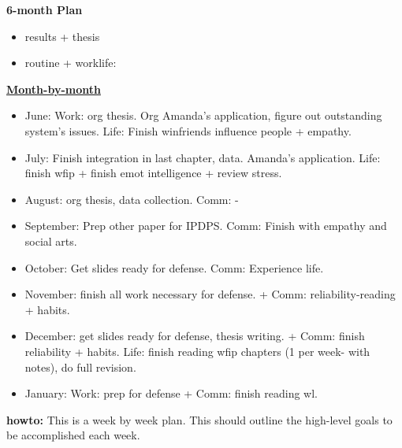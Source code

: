 \documentclass[11pt]{article}
\begin{document}
\textbf{6-month Plan} 
\begin{itemize} 
  \tiny \item \tiny results + thesis
\item \tiny routine + worklife:
\end{itemize}

\newpage
    {\small \underline{\textbf{Month-by-month}}}\\ 
    \begin{itemize}
      \small \item \small June: Work: org thesis. Org Amanda's application, figure out outstanding system's issues. Life: Finish winfriends influence people + empathy. 
    \item \small July: Finish integration in last chapter, data. Amanda's application. Life: finish wfip + finish emot intelligence + review stress. 
    \item \small August: org thesis, data collection. Comm:  - 
    \item \small September: Prep other paper for IPDPS. Comm: Finish with empathy and social arts. 
    \item \small October: Get slides ready for defense. Comm: Experience life. 
    \item \small November: finish all work necessary for defense.  + Comm: reliability-reading + habits. 
    \item \small December: get slides ready for defense, thesis writing.  + Comm: finish reliability + habits.  Life:
             finish reading wfip chapters (1 per week- with notes), 
             do full revision. 
           \item \small January: Work: prep for defense  +  Comm: finish reading wl. 
    \end{itemize} 
    
\newpage 
 \textbf{howto:} This is a week by week plan. This should outline the high-level goals to be accomplished each week.  \\

\end{document}
